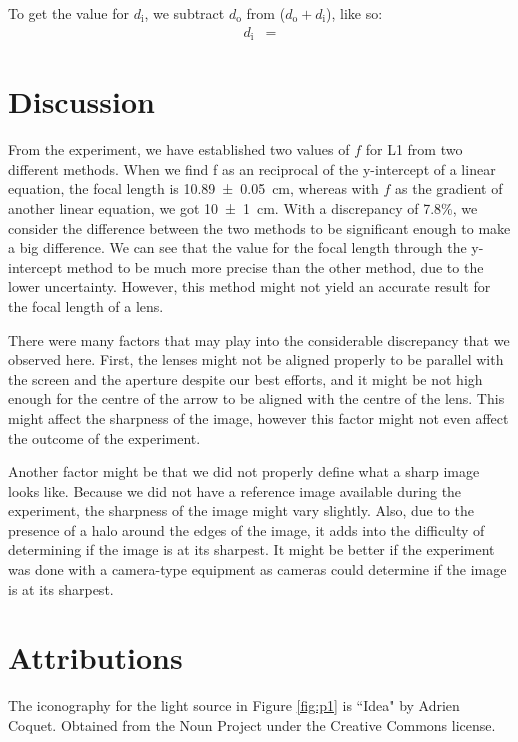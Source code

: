\documentclass[letter,12pt]{article}
\numberwithin{equation}{section}
\numberwithin{figure}{section}
\numberwithin{table}{section}
\newcommand{\dist}[1] {\(d_{\mathrm{#1}}\)}
\newcommand{\mdist}[1] {d_{\mathrm{#1}}}
\begin{document}
To get the value for \dist{i}, we subtract \dist{o} from (\(\mdist{o} + \mdist{i}\)), like so:
\begin{align*}
  \mdist{i} &= 
\end{align*}


\section{Discussion}
From the experiment, we have established two values of \(f\) for L1 from two different methods. When we find f as an reciprocal of the y-intercept of a linear equation, the focal length is \SI{10.89(5)}{\cm}, whereas with \(f\) as the gradient of another linear equation, we got \SI{10(1)}{\cm}. With a discrepancy of 7.8\%, we consider the difference between the two methods to be significant enough to make a big difference. We can see that the value for the focal length through the y-intercept method to be much more precise than the other method, due to the lower uncertainty. However, this method might not yield an accurate result for the focal length of a lens.

There were many factors that may play into the considerable discrepancy that we observed here. First, the lenses might not be aligned properly to be parallel with the screen and the aperture despite our best efforts, and it might be not high enough for the centre of the arrow to be aligned with the centre of the lens. This might affect the sharpness of the image, however this factor might not even affect the outcome of the experiment.

Another factor might be that we did not properly define what a sharp image looks like. Because we did not have a reference image available during the experiment, the sharpness of the image might vary slightly. Also, due to the presence of a halo around the edges of the image, it adds into the difficulty of determining if the image is at its sharpest. It might be better if the experiment was done with a camera-type equipment as cameras could determine if the image is at its sharpest.

\section{Attributions}
The iconography for the light source in Figure \ref{fig:p1} is ``Idea" by Adrien Coquet. Obtained from the Noun Project under the Creative Commons license.
\end{document}

